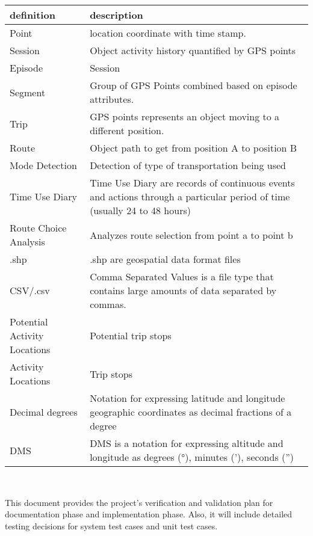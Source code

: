 \documentclass[12pt, titlepage]{article}
\begin{document}
\renewcommand{\arraystretch}{1.1}
\begin{tabular}{l p{9cm}} 
  \toprule		
  \textbf{definition} & \textbf{description}\\
  \midrule 
  Point & location coordinate with time stamp.\\
  Session & Object activity history quantified by GPS points \\
  Episode & Session\\
  Segment & Group of GPS Points combined based on episode attributes.\\
  Trip & GPS points represents an object moving to a different position.\\
  Route & Object path to get from position A to position B\\
  Mode Detection & Detection of type of transportation being used \\
  Time Use Diary & Time Use Diary are records of continuous events and actions through a particular period of time (usually 24 to 48 hours) \\
  Route Choice Analysis &  Analyzes route selection from point a to point b\\
  .shp & .shp are geospatial data format files\\
  CSV/.csv & Comma Separated Values is a file type that contains large amounts of data separated by commas. \\
  Potential Activity Locations  & Potential trip stops \\
  Activity Locations & Trip stops \\
Decimal degrees & Notation for expressing latitude and longitude geographic coordinates as decimal fractions of a degree \\
  DMS & DMS is a notation for expressing altitude and longitude as degrees (°), minutes ('), seconds ('')\\


  \bottomrule
\end{tabular}\\



\newpage


This document provides the project's verification and 
validation plan for documentation phase and implementation phase. Also, it will include detailed testing decisions for system test cases and unit test cases.  
\end{document}
